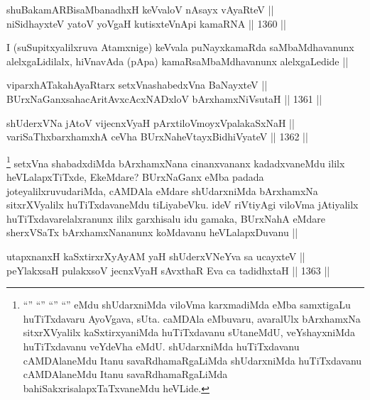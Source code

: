 
\begin{shl}
shuBakamARBisaMbanadhxH keVvaloV nAsayx vAyaRteV || \\
niSidhayxteV yatoV yoVgaH kutisxteVnApi kamaRNA ||  1360 ||  
\end{shl}

\begin{artha}
I (suSupitxyalilxruva Atamxnige) keVvala puNayxkamaRda saMbaMdhavanunx alelxgaLidilalx, hiVnavAda (pApa) kamaRsaMbaMdhavanunx alelxgaLedide ||
\end{artha}


\begin{shl}
viparxhATakahAyaRtarx setxVnashabedxVna BaNayxteV ||  \\
BUrxNaGanxsahacAritAvxcAcxNADxloV bArxhamxNiVsutaH ||  1361 ||  
\end{shl}
				
\begin{shl}
shUderxVNa jAtoV vijecnxVyaH pArxtiloVmoyxVpalakaSxNaH ||  \\
variSaThxbarxhamxhA ceVha BUrxNaheVtayxBidhiVyateV ||  1362 ||  
\end{shl}

\begin{artha}
\footnote{``\stext'' ``\stext'' ``\stext'' ``\stext'' eMdu shUdarxniMda viloVma karxmadiMda eMba samxtigaLu huTiTxdavaru AyoVgava, sUta. caMDAla eMbuvaru, avaralUlx bArxhamxNa sitxrXVyalilx kaSxtirxyaniMda huTiTxdavanu sUtaneMdU, veYshayxniMda huTiTxdavanu veYdeVha eMdU. shUdarxniMda huTiTxdavanu cAMDAlaneMdu Itanu savaRdhamaRgaLiMda shUdarxniMda huTiTxdavanu cAMDAlaneMdu Itanu savaRdhamaRgaLiMda bahiSakxrisalapxTaTxvaneMdu heVLide.}
setxVna shabadxdiMda bArxhamxNana cinanxvananx kadadxvaneMdu ililx heVLalapxTiTxde, EkeMdare? BUrxNaGanx eMba padada joteyalilxruvudariMda, cAMDAla eMdare shUdarxniMda bArxhamxNa sitxrXVyalilx huTiTxdavaneMdu tiLiyabeVku. ideV riVtiyAgi viloVma jAtiyalilx huTiTxdavarelalxranunx ililx garxhisalu idu gamaka, BUrxNahA eMdare sherxVSaTx bArxhamxNananunx koMdavanu heVLalapxDuvanu ||
\end{artha}


\begin{shl}
utapxnanxH kaSxtirxrXyAyAM yaH shUderxVNeYva sa ucayxteV || \\
peYlakxsaH pulakxsoV jecnxVyaH sAvxthaR Eva ca tadidhxtaH ||  1363 ||  
\end{shl}


